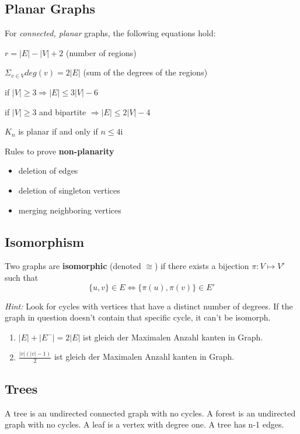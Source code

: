 \documentclass[11pt]{article}
\begin{document}
\subsection{Planar Graphs}

For \emph{connected, planar} graphs, the following equations hold:
\begin{description}[labelindent=16pt,style=multiline,leftmargin=4.5cm, noitemsep]
	\item $r  = |E| - |V| + 2$ (number of regions)
	\item $\Sigma_{v \in V}deg(v) = 2|E|$ (sum of the degrees of the regions)
	\item if $|V| \geq 3 \Rightarrow |E| \leq 3|V| - 6$
	\item if $|V| \geq 3$ and bipartite $\Rightarrow |E| \leq 2|V| - 4$
	\item $K_n$ is planar if and only if $n \leq 4$i
\end{description}

Rules to prove \textbf{non-planarity}
\begin{itemize}[noitemsep]
	\item deletion of edges
	\item deletion of singleton vertices
	\item merging neighboring vertices
\end{itemize}

\subsection{Isomorphism}

Two graphs are \textbf{isomorphic} (denoted $\cong$) if there exists a bijection $\pi: V \mapsto V'$ such that 
\begin{equation*}
	\{u,v\} \in E \Leftrightarrow \{\pi(u), \pi(v)\} \in E'
\end{equation*}

\emph{Hint:} Look for cycles with vertices that have a distinct number of degrees. If the graph in question doesn't contain that specific cycle, it can't be isomorph. 
\begin{enumerate}
	\item $|E|+|E^{-}| = 2|E|$ ist gleich der Maximalen Anzahl kanten in Graph.
	\item $\frac{|v|(|v|-1)}{2}$ ist gleich der Maximalen Anzahl kanten in Graph.
\end{enumerate}

\subsection{Trees}
A tree is an undirected connected graph with no cycles. A forest is an undirected graph with no cycles. A leaf is a vertex with degree one. A tree has n-1 edges.
\end{document}
